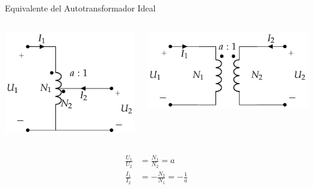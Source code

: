 \documentclass[aspectratio=169, usenames,svgnames,dvipsnames]{beamer}
\begin{document}
\begin{frame}[label={sec:org38b3d5f}]{Equivalente del Autotransformador Ideal}
\begin{columns}
\begin{column}[b]{0.5\columnwidth}
\begin{center}
\includegraphics[width=.9\linewidth]{../figs/AutoTrafoIdeal.pdf}
\end{center}
\end{column}

\begin{column}[b]{0.5\columnwidth}
\begin{center}
\includegraphics[width=.9\linewidth]{../figs/Trafo_Ideal2.pdf}
\end{center}
\end{column}
\end{columns}

\begin{beamercolorbox}{}
\begin{align*}
  \frac{U_1}{U_2} &= \frac{N_1}{N_2} = a\\
  \frac{I_1}{I_2} &= - \frac{N_2}{N_1} = - \frac{1}{a}
\end{align*}
\end{beamercolorbox}
\end{frame}
\end{document}
